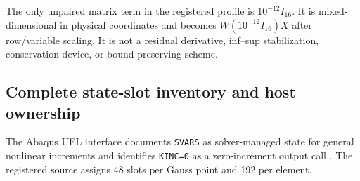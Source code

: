 \documentclass[preprint,12pt,authoryear]{elsarticle}
\begin{document}
The only unpaired matrix term in the registered profile is $10^{-12}I_{16}$. It is mixed-dimensional in physical coordinates and becomes $W(10^{-12}I_{16})X$ after row/variable scaling. It is not a residual derivative, inf--sup stabilization, conservation device, or bound-preserving scheme.

\subsection{Complete state-slot inventory and host ownership}

The Abaqus UEL interface documents \texttt{SVARS} as solver-managed state for general nonlinear increments and identifies \texttt{KINC=0} as a zero-increment output call \citep{abaqus2026uel}. The registered source assigns 48 slots per Gauss point and 192 per element.
\end{document}
